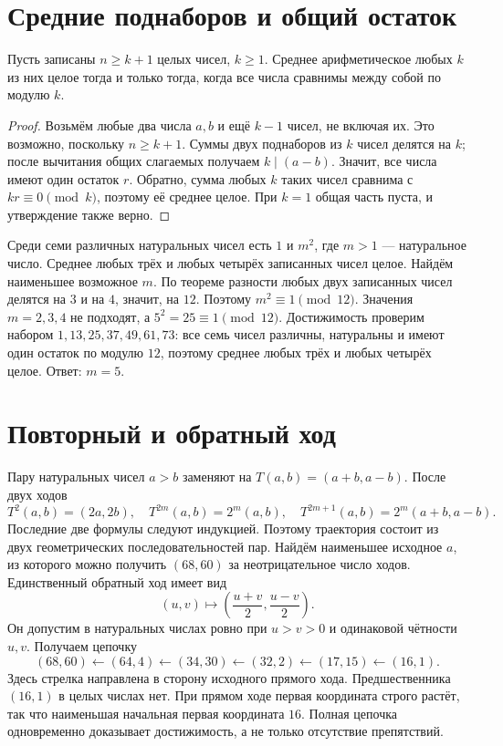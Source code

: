 \section{Средние поднаборов и общий остаток}
\begin{theorem}
Пусть записаны \(n\ge k+1\) целых чисел, \(k\ge1\). Среднее арифметическое любых \(k\) из них целое тогда и только тогда, когда все числа сравнимы между собой по модулю \(k\).
\end{theorem}
\begin{proof}
Возьмём любые два числа \(a,b\) и ещё \(k-1\) чисел, не включая их. Это возможно, поскольку \(n\ge k+1\). Суммы двух поднаборов из \(k\) чисел делятся на \(k\); после вычитания общих слагаемых получаем \(k\mid(a-b)\). Значит, все числа имеют один остаток \(r\). Обратно, сумма любых \(k\) таких чисел сравнима с \(kr\equiv0\pmod k\), поэтому её среднее целое. При \(k=1\) общая часть пуста, и утверждение также верно.
\end{proof}
\begin{example}\label{ex:review-ege-c21-1}
Среди семи различных натуральных чисел есть \(1\) и \(m^2\), где \(m>1\) --- натуральное число. Среднее любых трёх и любых четырёх записанных чисел целое. Найдём наименьшее возможное \(m\). По теореме разности любых двух записанных чисел делятся на \(3\) и на \(4\), значит, на \(12\). Поэтому \(m^2\equiv1\pmod{12}\). Значения \(m=2,3,4\) не подходят, а \(5^2=25\equiv1\pmod{12}\). Достижимость проверим набором \(1,13,25,37,49,61,73\): все семь чисел различны, натуральны и имеют один остаток по модулю \(12\), поэтому среднее любых трёх и любых четырёх целое. Ответ: \(m=5\).
\end{example}

\section{Повторный и обратный ход}
\begin{example}\label{ex:review-ege-c21-2}
Пару натуральных чисел \(a>b\) заменяют на \(T(a,b)=(a+b,a-b)\). После двух ходов
\[
T^2(a,b)=(2a,2b),\quad
T^{2m}(a,b)=2^m(a,b),\quad
T^{2m+1}(a,b)=2^m(a+b,a-b).
\]
Последние две формулы следуют индукцией. Поэтому траектория состоит из двух геометрических последовательностей пар.
Найдём наименьшее исходное \(a\), из которого можно получить \((68,60)\) за неотрицательное число ходов. Единственный обратный ход имеет вид
\[
(u,v)\longmapsto\left(\frac{u+v}{2},\frac{u-v}{2}\right).
\]
Он допустим в натуральных числах ровно при \(u>v>0\) и одинаковой чётности \(u,v\). Получаем цепочку
\[
(68,60)\leftarrow(64,4)\leftarrow(34,30)
\leftarrow(32,2)\leftarrow(17,15)\leftarrow(16,1).
\]
Здесь стрелка направлена в сторону исходного прямого хода. Предшественника \((16,1)\) в целых числах нет. При прямом ходе первая координата строго растёт, так что наименьшая начальная первая координата \(16\). Полная цепочка одновременно доказывает достижимость, а не только отсутствие препятствий.
\end{example}

